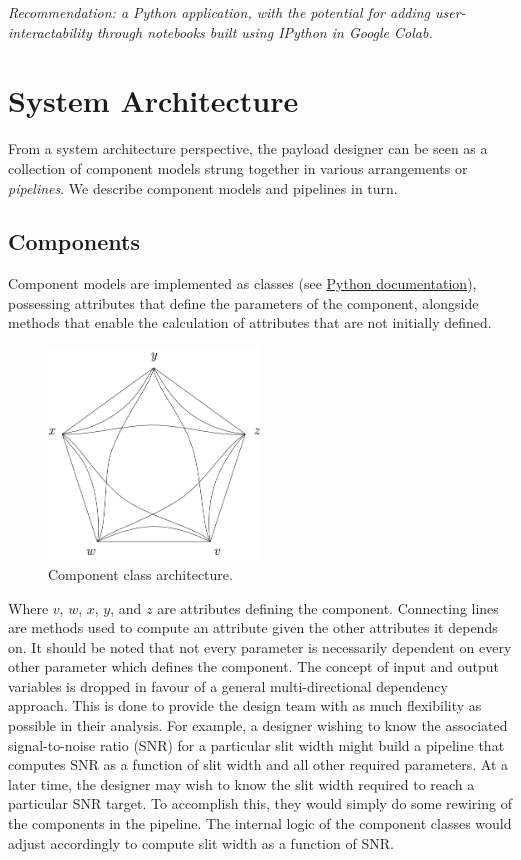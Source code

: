 \documentclass{article}
\begin{document}
\textit{\checkmark Recommendation: a Python application, with the potential for adding user-interactability through notebooks built using IPython in Google Colab.}

\section{System Architecture}

From a system architecture perspective, the payload designer can be seen as a collection of component models strung together in various arrangements or \textit{pipelines}. We describe component models and pipelines in turn.

\subsection{Components}
Component models are implemented as classes (see \href{https://docs.python.org/3/tutorial/classes.html}{Python documentation}), possessing attributes that define the parameters of the component, alongside methods that enable the calculation of attributes that are not initially defined.

\begin{figure}[H]
\centering
\includegraphics[width=0.5\textwidth]{figures/component-architecture.png}
\caption{Component class architecture.}
\label{fig:component-architecture}
\end{figure}

Where $v$, $w$, $x$, $y$, and $z$ are attributes defining the component. Connecting lines are methods used to compute an attribute given the other attributes it depends on. It should be noted that not every parameter is necessarily dependent on every other parameter which defines the component. The concept of input and output variables is dropped in favour of a general multi-directional dependency approach. This is done to provide the design team with as much flexibility as possible in their analysis. For example, a designer wishing to know the associated signal-to-noise ratio (SNR) for a particular slit width might build a pipeline that computes SNR as a function of slit width and all other required parameters. At a later time, the designer may wish to know the slit width required to reach a particular SNR target. To accomplish this, they would simply do some rewiring of the components in the pipeline. The internal logic of the component classes would adjust accordingly to compute slit width as a function of SNR.
\end{document}
